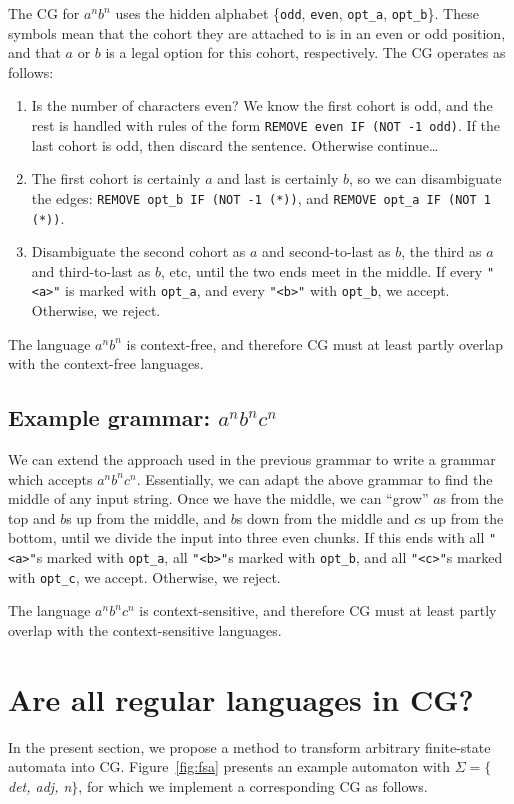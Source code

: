 \documentclass[11pt]{article}
\def\t#1{\texttt{#1}}
\begin{document}
The CG for $a^nb^n$ uses the hidden alphabet \{\t{odd}, \t{even}, \t{opt\_a},
\t{opt\_b}\}. These symbols mean that the cohort they are attached to is in an
even or odd position, and that $a$ or $b$ is a legal option for this cohort,
respectively. The CG operates as follows: 
\begin{enumerate}
\item
  Is the number of characters even? We know the first cohort is odd, and the
  rest is handled with rules of the form \t{REMOVE even IF (NOT -1 odd)}. If the
  last cohort is odd, then discard the sentence. Otherwise continue\dots
\item
  The first cohort is certainly $a$ and last is certainly $b$, so we can
  disambiguate the edges: 
  \t{REMOVE opt\_b IF (NOT -1 (*))}, and \t{REMOVE opt\_a IF (NOT 1 (*))}. 
\item
  Disambiguate the second cohort as $a$ and second-to-last as $b$, the third as
  $a$ and third-to-last as $b$, etc, until the two ends meet in the middle. If
  every \t{"<a>"} is marked with \t{opt\_a}, and every \t{"<b>"} with
  \t{opt\_b}, we accept. Otherwise, we reject.  
\end{enumerate}
The language $a^nb^n$ is context-free, and therefore CG must at least partly
overlap with the context-free languages.


\subsection{Example grammar: $a^nb^nc^n$}
We can extend the approach used in the previous grammar to write a grammar which
accepts $a^nb^nc^n$. Essentially, we can adapt the above grammar to find the
middle of any input string. Once we have the middle, we can ``grow'' $a$s from
the top and $b$s up from the middle, and $b$s down from the middle and $c$s up
from the bottom, until we divide the input into three even chunks.
If this ends with all \t{"<a>"}s marked with \t{opt\_a}, all \t{"<b>"}s marked
with \t{opt\_b}, and all \t{"<c>"}s marked with \t{opt\_c}, we accept.
Otherwise, we reject.

The language $a^nb^nc^n$ is context-sensitive, and therefore CG must at least
partly overlap with the context-sensitive languages. 


\section{Are all regular languages in CG?}
In the present section, we propose a method to transform arbitrary finite-state
automata into CG. Figure~\ref{fig:fsa} presents an example automaton with
$\Sigma = \{$\emph{det, adj, n}$\}$, for which we implement a corresponding CG
as follows.
\end{document}
